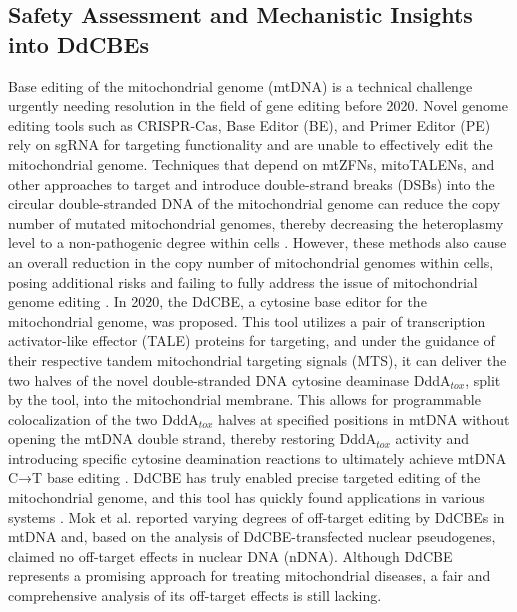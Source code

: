 \documentclass[12pt]{article}
\begin{document}
\subsection*{Safety Assessment and Mechanistic Insights into DdCBEs}
Base editing of the mitochondrial genome (mtDNA) is a technical challenge urgently needing resolution 
in the field of gene editing before 2020. 
Novel genome editing tools such as CRISPR-Cas, Base Editor (BE), and Primer Editor (PE) rely on 
sgRNA for targeting functionality and are unable to effectively edit the mitochondrial genome.
Techniques that depend on mtZFNs, mitoTALENs, and other approaches to target and introduce 
double-strand breaks (DSBs) into the circular double-stranded DNA of the mitochondrial genome can reduce the copy number 
of mutated mitochondrial genomes, thereby decreasing the heteroplasmy level to a non-pathogenic degree within cells \cite{mok2020bacterial}. 
However, these methods also cause an overall reduction in the copy number of mitochondrial genomes within cells, 
posing additional risks and failing to fully address the issue of mitochondrial genome editing \cite{mok2020bacterial}. 
In 2020, the DdCBE, a cytosine base editor for the mitochondrial genome, was proposed. 
This tool utilizes a pair of transcription activator-like effector (TALE) proteins for targeting, 
and under the guidance of their respective tandem mitochondrial targeting signals (MTS), 
it can deliver the two halves of the novel double-stranded DNA cytosine deaminase DddA$_{tox}$, 
split by the tool, into the mitochondrial membrane. 
This allows for programmable colocalization of the two DddA$_{tox}$ halves at specified positions 
in mtDNA without opening the mtDNA double strand, thereby restoring DddA$_{tox}$ activity and introducing 
specific cytosine deamination reactions to ultimately achieve mtDNA C→T base editing \cite{mok2020bacterial}. 
DdCBE has truly enabled precise targeted editing of the mitochondrial genome, 
and this tool has quickly found applications in various systems \cite{wei2022human, chen2022ddcbe, kang2021chloroplast, guo2022ddcbe}. 
Mok et al. reported varying degrees of off-target editing by DdCBEs in mtDNA and, 
based on the analysis of DdCBE-transfected nuclear pseudogenes, claimed no off-target effects in nuclear DNA (nDNA). 
Although DdCBE represents a promising approach for treating mitochondrial diseases, 
a fair and comprehensive analysis of its off-target effects is still lacking.
\end{document}
